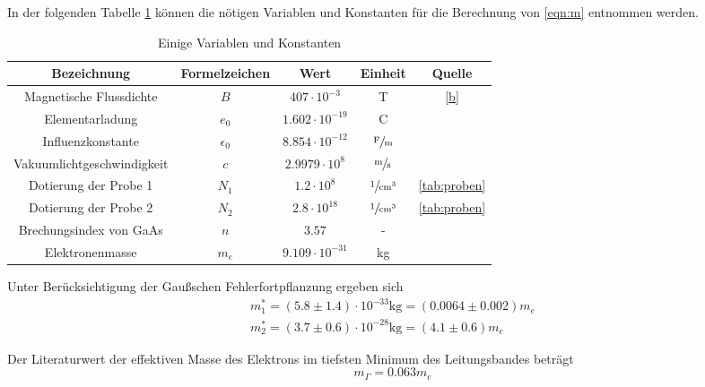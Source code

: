 In der folgenden Tabelle \ref{tab:var} können die nötigen Variablen und Konstanten für die Berechnung von \eqref{eqn:m} entnommen werden.
\begin{table}[H]
  \centering
  \begin{tabular}{ccccc}
    \toprule
    Bezeichnung & Formelzeichen & Wert & Einheit & Quelle \\
    \midrule
    Magnetische Flussdichte    & $B$          & $407\cdot10^{-3}$    & T                           & \eqref{b} \\
    Elementarladung            & $e_0$        & $1.602\cdot10^{-19}$ & C                           & \cite{pdg} \\
    Influenzkonstante          & $\epsilon_0$ & $8.854\cdot10^{-12}$ & $\sfrac{\text{F}}{\text{m}}$ & \cite{pdg} \\
    Vakuumlichtgeschwindigkeit & $c$          & $2.9979\cdot10^{8}$  & $\sfrac{\text{m}}{\text{s}}$               & \cite{pdg} \\
    Dotierung der Probe 1      & $N_1$        & $1.2\cdot10^{8}$     & $\sfrac{1}{\text{cm}^3}$     & \ref{tab:proben} \\
    Dotierung der Probe 2      & $N_2$        & $2.8\cdot10^{18}$    & $\sfrac{1}{\text{cm}^3}$     & \ref{tab:proben} \\
    Brechungsindex von GaAs    & $n$          & $3.57$               & -                           & \cite{cb} \\
    Elektronenmasse            & $m_e$        & $9.109\cdot10^{-31}$ & kg                          & \cite{pdg} \\
    \bottomrule
  \end{tabular}
  \caption{Einige Variablen und Konstanten}
  \label{tab:var}
\end{table}

Unter Berücksichtigung der Gaußschen Fehlerfortpflanzung ergeben sich
\begin{gather*}
  m_1^* = (5.8 \pm 1.4)\cdot10^{-33}\text{kg} = (0.0064 \pm 0.002)m_e \\
  m_2^* = (3.7 \pm 0.6)\cdot10^{-28}\text{kg} = (4.1 \pm 0.6)m_e
\end{gather*}

Der Literaturwert der effektiven Masse des Elektrons im tiefsten Minimum des Leitungsbandes \cite{ru} beträgt
\begin{equation*}
  m_{\Gamma} = 0.063 m_e
\end{equation*}

